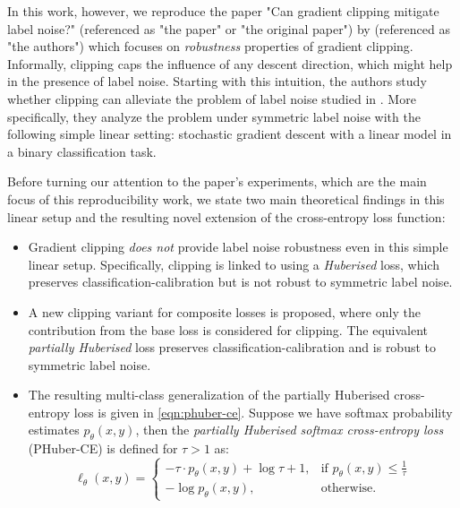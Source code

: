 In this work, however, we reproduce the paper "Can gradient clipping mitigate label noise?" (referenced as "the paper" or "the original paper") by \textcite{menon_can_2019} (referenced as "the authors") which focuses on \emph{robustness} properties of gradient clipping. Informally, clipping caps the influence of any descent direction, which might help in the presence of label noise. Starting with this intuition, the authors study whether clipping can alleviate the problem of label noise studied in \textcite{ekholm1982model, menon2015learning, zhang_generalized_2018}.
More specifically, they analyze the problem under symmetric label noise with the following simple linear setting: stochastic gradient descent with a linear model in a binary classification task.

Before turning our attention to the paper's experiments, which are the main focus of this reproducibility work, we state two main theoretical findings in this linear setup and the resulting novel extension of the cross-entropy loss function:
\begin{itemize}

\item Gradient clipping \emph{does not} provide label noise robustness even in this simple linear setup.
Specifically, clipping is linked to using a \textit{Huberised} loss, which preserves classification-calibration but is not robust to symmetric label noise.

\item A new clipping variant for composite losses is proposed, where only the contribution from the base loss is considered for clipping.
The equivalent \textit{partially Huberised} loss preserves classification-calibration and is robust to symmetric label noise.

\item The resulting multi-class generalization of the partially Huberised  cross-entropy loss is given in \autoref{eqn:phuber-ce}. Suppose we have softmax probability estimates $p_\theta(x,y)$, then the \emph{partially Huberised softmax cross-entropy loss} (PHuber-CE) is defined for $\tau > 1$ as:
\begin{equation}
\label{eqn:phuber-ce}
\ell_\theta(x,y)= 
\begin{cases}
    - \tau \cdot p_\theta(x,y) + \log \tau + 1,& \text{if } p_\theta(x,y) \leq \frac {1}{\tau}\\
    -\log p_\theta(x,y),              & \text{otherwise.}
\end{cases}
\end{equation}

\end{itemize}

